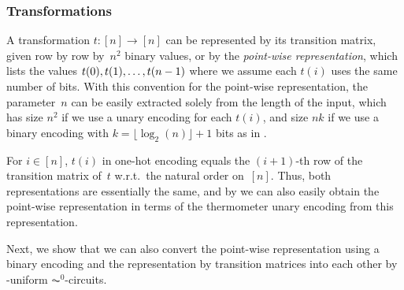 \subsubsection{Transformations}

A transformation $t \colon [n]\to [n]$
can be represented by its transition matrix, given row by row by~$n^2$ binary values,
or by the \emph{point-wise representation}, which lists the values $\applyfunc{0}{t}, \applyfunc{1}{t},
\ldots, \applyfunc{n-1}{t}$ where we assume each $t(i)$ uses the same number of bits.
With this convention for the point-wise representation, the parameter~$n$ can be easily extracted solely
from the length of the input, which has size $n^2$
if we use a unary encoding for each $t(i)$, and size $nk$
if we use a binary encoding with $k = \lfloor \log_2(n) \rfloor + 1$ bits
as in .

For $i \in [n]$, $t(i)$ in one-hot encoding equals
the $(i+1)$-th row of the transition matrix of~$t$ w.r.t.~the natural order on~$[n]$.
Thus, both representations are essentially the same,
and by 
we can also easily obtain the point-wise representation
in terms of the thermometer unary encoding from this representation.

Next, we show
that we can also convert the point-wise representation
using a binary encoding and the representation by transition matrices into each other
by \LOGSPACE-uniform  $\AC^0$-circuits.


